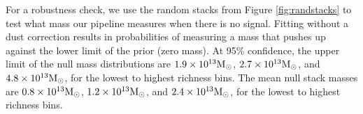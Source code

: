 \documentclass[a4paper,fleqn,usenatbib]{mnras}
\begin{document}
For a robustness check, we use the random stacks from Figure \ref{fig:randstacks} to test what mass our pipeline measures when there is no signal. 
Fitting without a dust correction results in probabilities of measuring a mass that pushes up against the lower limit of the prior (zero mass). 
At 95\% confidence, the upper limit of the null mass distributions are $1.9 \times 10^{13} \rm M_{\odot}$, $2.7 \times 10^{13} \rm M_{\odot}$, and $4.8 \times 10^{13} \rm M_{\odot}$, for the lowest to highest richness bins.
{The mean null stack masses are $0.8 \times 10^{13} \rm M_{\odot}$, $1.2 \times 10^{13} \rm M_{\odot}$, and $2.4 \times 10^{13} \rm M_{\odot}$, for the lowest to highest richness bins.}
\end{document}
